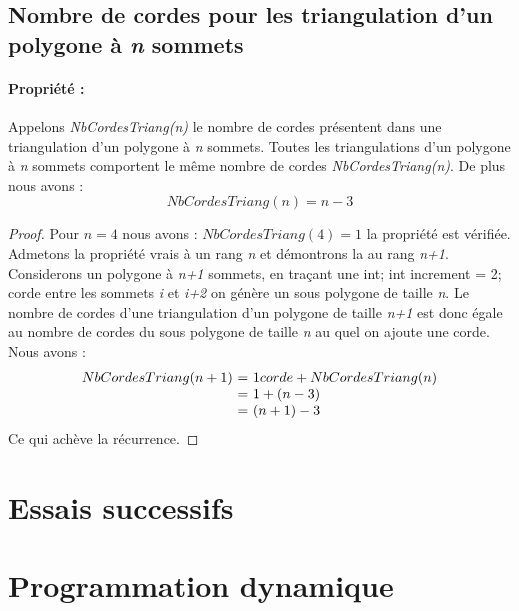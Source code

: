 \documentclass[a4paper,10pt]{article}
\begin{document}
\subsection{Nombre de cordes pour les triangulation d'un polygone à \emph{n} sommets}

\paragraph{Propriété :}  
Appelons \emph{NbCordesTriang(n)} le nombre de cordes présentent dans une triangulation d'un polygone à \emph{n} sommets.
Toutes les triangulations d'un polygone à \emph{n} sommets comportent le même nombre de cordes \emph{NbCordesTriang(n)}.
De plus nous avons :
\begin{equation} 
NbCordesTriang(n) = n-3
\end{equation}

\begin{proof}
Pour \(n = 4\) nous avons : \(NbCordesTriang(4) = 1 \) la propriété est vérifiée. \\
Admetons la propriété vrais à un rang \emph{n} et démontrons la au rang \emph{n+1}. \\
Considerons un polygone à \emph{n+1} sommets, en traçant une	int;
	int increment = 2; corde entre les sommets \emph{i} et \emph{i+2} on génère un sous polygone de taille \emph{n}.
Le nombre de cordes d'une triangulation d'un polygone de taille \emph{n+1} est donc égale au nombre de cordes du sous polygone de taille \emph{n} au quel on ajoute une corde.
Nous avons :\\
\[
\begin{array}{r @{=} l}
NbCordesTriang(n+1) \ & \  1 corde + NbCordesTriang(n) \\
			  & \ 1 + (n-3) \\
			  & \ (n+1) - 3
\end{array}
\]
Ce qui achève la récurrence.
\end{proof}





\section{Essais successifs}

\section{Programmation dynamique}
\end{document}
